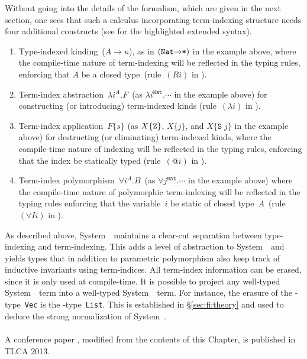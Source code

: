 Without going into the details of the formalism, which are given in the
next section, one sees that such a calculus incorporating term-indexing
structure needs four additional constructs (see  for the
highlighted extended syntax).
\begin{enumerate}
\item 
  Type-indexed kinding~($A\to\kappa$), as in $(\texttt{{Nat}\ensuremath{\to}*})$
  in the example above, where the compile-time nature of term-indexing
  will be reflected in the typing rules, enforcing that $A$ be a closed
  type~(rule~$(Ri)$ in ).

\item 
  Term-index abstraction~$\lambda i^A.F$~(as
  $\lambda i^{\texttt{{Nat}}}.\cdots$ in the example above) for constructing
  (or introducing) term-indexed kinds (rule~$(\lambda i)$ in ).

\item 
  Term-index application~$F\{s\}$ (as $X\{{\tt Z}\}$, $X\{j\}$, and
  $X\{\texttt{S}\;j\}$ in the example above) for destructing (or
  eliminating) term-indexed kinds, where the compile-time nature of
  indexing will be reflected in the typing rules, enforcing that the index be
  statically typed (rule~$(@i)$ in ).

\item 
  Term-index polymorphism~$\forall i^A.B$~(as
  $\forall j^{\texttt{{Nat}}}.\cdots$ in the example above)
  where the compile-time nature of polymorphic term-indexing
  will be reflected in the typing rules enforcing that the variable~$i$
  be static of closed type~$A$~(rule~$(\forall Ii)$ in ).
\end{enumerate}

As described above, System~\Fi\ maintains a clear-cut separation between
type-indexing and term-indexing.  This adds a level of abstraction
to System~\Fw\ and yields types that in addition to parametric polymorphism
also keep track of inductive invariants using term-indices. All term-index
information can be erased, since it is only used at compile-time.  
It is possible to project any well-typed System~\Fi\ term into
a well-typed System~\Fw\ term.
For instance, the erasure of the \Fi-type~\texttt{Vec}
is the \Fw-type~\texttt{List}.  This is established in
\S\ref{sec:fi:theory} and used to deduce the strong normalization of
System~\Fi.

\paragraph{}
A conference paper \cite{AhnSheFioPit13}, modified from
the contents of this Chapter, is published in TLCA 2013.






